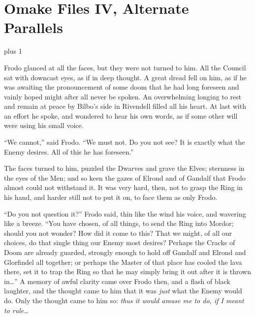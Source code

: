
\newcommand{\OmakeIVspecialsection}[2][1.5]{%
\vspace*{2\baselineskip plus 1\baselineskip minus 1\baselineskip}%
\noindent\hfill\scalebox{#1}{#2}\hfill\mbox{}%
\vskip 1\baselineskip plus 1\baselineskip\noindent
}

\newcommand{\OmakeIVsection}[2][1.5]{%
  \OmakeIVspecialsection[#1]{\MakeUppercase{#2}}
}

\chapter{Omake Files IV, Alternate Parallels}

\OmakeIVspecialsection[1.6]{\fontspec[ExternalLocation]{RingBearer}
\settowidth{\versewidth}{\mbox{the}}
Lord\scalebox{.40}{\parbox[b]{\versewidth}{%
        \centering of\\\nointerlineskip\vskip 4pt the}}Ratîonalît\raisebox{-.32ex}{Y}}
Frodo glanced at all the faces, but they were not turned to him. All the Council sat with downcast eyes, as if in deep thought. A great dread fell on him, as if he was awaiting the pronouncement of some doom that he had long foreseen and vainly hoped might after all never be spoken. An overwhelming longing to rest and remain at peace by Bilbo’s side in Rivendell filled all his heart. At last with an effort he spoke, and wondered to hear his own words, as if some other will were using his small voice.

“We cannot,” said Frodo. “We must not. Do you not see? It is exactly what the Enemy desires. All of this he has foreseen.”

The faces turned to him, puzzled the Dwarves and grave the Elves; sternness in the eyes of the Men; and so keen the gazes of Elrond and of Gandalf that Frodo almost could not withstand it. It was very hard, then, not to grasp the Ring in his hand, and harder still not to put it on, to face them as only Frodo.

“Do you not question it?” Frodo said, thin like the wind his voice, and wavering like a breeze. “You have chosen, of all things, to send the Ring into Mordor; should you not wonder? How did it come to this? That we might, of all our choices, do that single thing our Enemy most desires? Perhaps the Cracks of Doom are already guarded, strongly enough to hold off Gandalf and Elrond and Glorfindel all together; or perhaps the Master of that place has cooled the lava there, set it to trap the Ring so that he may simply bring it out after it is thrown in…” A memory of awful clarity came over Frodo then, and a flash of black laughter, and the thought came to him that it was \emph{just} what the Enemy would do. Only the thought came to him so: \emph{thus it would amuse me to do, if I meant to rule…}

